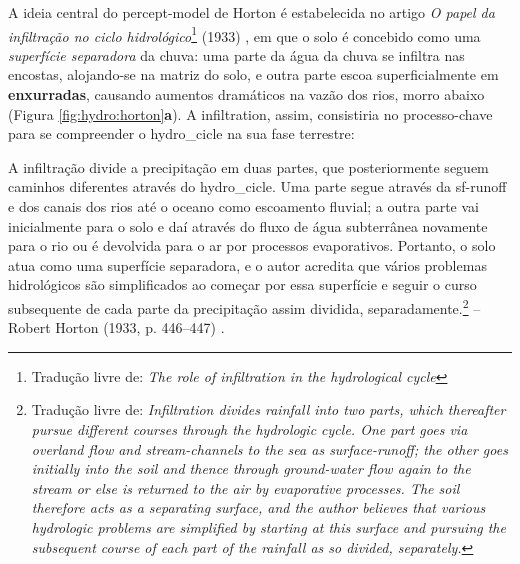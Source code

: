 \documentclass[./main.tex]{subfiles}
\begin{document}
\par A ideia central do \gls{percept-model} de Horton é estabelecida no artigo \textit{O papel da infiltração no ciclo hidrológico}\footnote{Tradução livre de: \textit{The role of infiltration in the hydrological cycle}} (1933) \cite{Horton1933}, em que o solo é concebido como uma \textit{superfície separadora} da chuva: uma parte da água da chuva se infiltra nas encostas, alojando-se na matriz do solo, e outra parte escoa superficialmente em \textbf{enxurradas}, causando aumentos dramáticos na vazão dos rios, morro abaixo (Figura \ref{fig:hydro:horton}\textbf{a}). A \gls{infiltration}, assim, consistiria no processo-chave para se compreender o \gls{hydro_cicle} na sua fase terrestre:

\begin{adjustwidth}{100pt}{0pt}
\medskip
\small A infiltração divide a precipitação em duas partes, que posteriormente seguem caminhos diferentes através do \gls{hydro_cicle}. Uma parte segue através da \gls{sf-runoff} e dos canais dos rios até o oceano como escoamento fluvial; a outra parte vai inicialmente para o solo e daí através do fluxo de água subterrânea novamente para o rio ou é devolvida para o ar por processos evaporativos. Portanto, o solo atua como uma superfície separadora, e o autor acredita que vários problemas hidrológicos são simplificados ao começar por essa superfície e seguir o curso subsequente de cada parte da precipitação assim dividida, separadamente.\footnote{Tradução livre de: \textit{Infiltration divides rainfall into two parts, which thereafter pursue different courses through the hydrologic cycle. One part goes via overland flow and stream-channels to the sea as surface-runoff; the other goes initially into the soil and thence through ground-water flow again to the stream or else is returned to the air by evaporative processes. The soil therefore acts as a separating surface, and the author believes that various hydrologic problems are simplified by starting at this surface and pursuing the subsequent course of each part of the rainfall as so divided, separately.}} -- Robert Horton (1933, p. 446–447) \cite{Horton1933}. 
\medskip
\end{adjustwidth}
\end{document}
